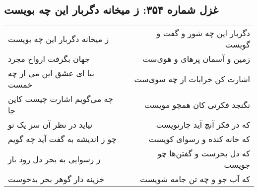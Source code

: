\begin{center}
\section*{غزل شماره ۳۵۴: ز میخانه دگربار این چه بویست}
\label{sec:0354}
\begin{longtable}{l p{0.5cm} r}
ز میخانه دگربار این چه بویست
&&
دگربار این چه شور و گفت و گویست
\\
جهان بگرفت ارواح مجرد
&&
زمین و آسمان پرهای و هوی‌ست
\\
بیا ای عشق این می از چه خمست
&&
اشارت کن خرابات از چه سوی‌ست
\\
چه می‌گویم اشارت چیست کاین جا
&&
نگنجد فکرتی کان همچو مویست
\\
نیاید در نظر آن سر یک تو
&&
که در فکر آنچ آید چارتویست
\\
چو ز اندیشه به گفت آید چه گویم
&&
که خانه کنده و رسوای کویست
\\
ز رسوایی به بحر دل رود باز
&&
که دل بحرست و گفتن‌ها چو جویست
\\
خزینه دار گوهر بحر بدخوست
&&
که آب جو و چه تن جامه شویست
\\
\end{longtable}
\end{center}
